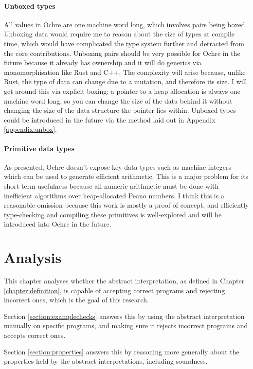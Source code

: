 \documentclass[12pt,twoside]{report}
\begin{document}
\subsubsection{Unboxed types}
All values in Ochre are one machine word long, which involves pairs being boxed. Unboxing data would require me to reason about the size of types at compile time, which would have complicated the type system further and detracted from the core contributions. Unboxing pairs should be very possible for Ochre in the future because it already has ownership and it will do generics via monomorphisation like Rust and C++. The complexity will arise because, unlike Rust, the type of data can change due to a mutation, and therefore its size. I will get around this via explicit boxing: a pointer to a heap allocation is always one machine word long, so you can change the size of the data behind it without changing the size of the data structure the pointer lies within. Unboxed types could be introduced in the future via the method laid out in Appendix \ref{appendix:unbox}.

\subsubsection{Primitive data types}
As presented, Ochre doesn't expose key data types such as machine integers which can be used to generate efficient arithmetic. This is a major problem for its short-term usefulness because all numeric arithmetic must be done with inefficient algorithms over heap-allocated Peano numbers. I think this is a reasonable omission because this work is mostly a proof of concept, and efficiently type-checking and compiling these primitives is well-explored and will be introduced into Ochre in the future.

\chapter{Analysis}
This chapter analyses whether the abstract interpretation, as defined in Chapter \ref{chapter:definition}, is capable of accepting correct programs and rejecting incorrect ones, which is the goal of this research.

Section \ref{section:examplechecks} answers this by using the abstract interpretation manually on specific programs, and making sure it rejects incorrect programs and accepts correct ones.

Section \ref{section:properties} answers this by reasoning more generally about the properties held by the abstract interpretations, including soundness.
\end{document}
